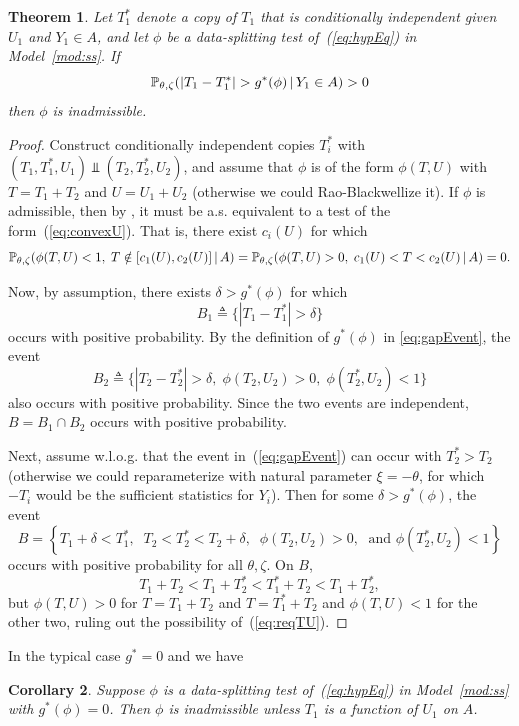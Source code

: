 \documentclass{article}
\newtheorem{theorem}{Theorem}
\newtheorem{corollary}[theorem]{Corollary}
\theoremstyle{definition}
\begin{document}
\begin{theorem}\label{thm:ssInadm}
Let $T_1^*$ denote a copy of $T_1$ that is conditionally independent given $U_1$ and $Y_1\in A$, and let $\phi$ be a data-splitting test of~(\ref{eq:hypEq}) in Model~\ref{mod:ss}. If
\[
\mathbb{P}_{\theta,\zeta}(|T_1-T_1^*| > g^*(\phi) \,|\, Y_1\in A) > 0
\]
then $\phi$ is inadmissible.
\end{theorem}

\begin{proof}
  Construct conditionally independent copies $T_i^*$ with $(T_1,T_1^*,U_1) \Perp (T_2,T_2^*,U_2)$, and assume that $\phi$ is of the form $\phi(T, U)$ with $T=T_1+T_2$ and $U=U_1+U_2$ (otherwise we could Rao-Blackwellize it). If $\phi$ is admissible, then by \citet{matthes1967tests}, it must be a.s. equivalent to a test of the form~(\ref{eq:convexU}). That is, there exist $c_i(U)$ for which
  \begin{equation}\label{eq:reqTU}
  \mathbb{P}_{\theta,\zeta}(\phi(T,U) < 1, \; T \notin [c_1(U),c_2(U)] \,|\, A) =
  \mathbb{P}_{\theta,\zeta}(\phi(T,U) > 0, \; c_1(U) < T < c_2(U)\,|\, A) = 0.
  \end{equation}

Now, by assumption, there exists $\delta > g^*(\phi)$ for which
\[ B_1 \triangleq \{ |T_1 - T_1^*| > \delta \} \]
occurs with positive probability. By the definition of $g^*(\phi)$ in \eqref{eq:gapEvent}, the event
\[ B_2 \triangleq \{ |T_2 - T_2^*| > \delta,\; \phi(T_2, U_2) > 0,\; \phi(T_2^*, U_2) < 1 \} \]
also occurs with positive probability. Since the two events are independent, $B = B_1 \cap B_2$ occurs with positive probability.



  Next, assume w.l.o.g. that the event in~(\ref{eq:gapEvent}) can occur with $T_2^*>T_2$ (otherwise we could reparameterize with natural parameter $\xi=-\theta$, for which $-T_i$ would be the sufficient statistics for $Y_i$). Then for some $\delta>g^*(\phi)$, the event
  \[
  B = \left\{T_1 + \delta < T_1^*,\;\; T_2 < T_2^* < T_2 + \delta,\;\; \phi(T_2,U_2) > 0,\; \text{ and } \phi(T_2^*,U_2) < 1\right\}
  \]
  occurs with positive probability for all $\theta,\zeta$. On $B$,
  \[
  T_1 + T_2 < T_1 + T_2^* < T_1^* + T_2 < T_1 + T_2^*,
  \]
  but $\phi(T,U) > 0$ for $T=T_1+T_2$ and $T=T_1^*+T_2$ and $\phi(T,U)<1$ for the other two, ruling out the possibility of~(\ref{eq:reqTU}).
\end{proof}

In the typical case $g^*=0$ and we have
\begin{corollary}
  Suppose $\phi$ is a data-splitting test of~(\ref{eq:hypEq}) in Model~\ref{mod:ss} with $g^*(\phi) = 0$. Then $\phi$ is inadmissible unless $T_1$ is a function of $U_1$ on $A$.
\end{corollary}
\end{document}
